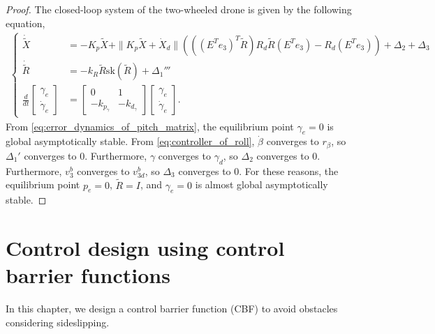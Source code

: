 \begin{proof}
    The closed-loop system of the two-wheeled drone is given by the following equation,
    \begin{align}
        \label{eq:stability_proof_of_cascade_1}
        \begin{cases}
            \dot{\tilde{X}} &= - K_p \tilde{X} + \| K_p \tilde{X} + \dot{X}_d \| \left ( \left ( \left (E^Te_3 \right )^T \tilde{R} \right ) R_d \tilde{R} (E^T e_3) - R_d (E^T e_3) \right ) + \Delta_2 + \Delta_3 \\
            \dot{\tilde{R}} &= - k_R \tilde{R} \mathrm{sk} (\tilde{R}) + \Delta_1''' \\
            \frac{d}{dt}
            \begin{bmatrix}
                \gamma_e \\
                \dot{\gamma}_e
            \end{bmatrix}
            &=
            \begin{bmatrix}
                0 & 1 \\
                - k_{p_{\gamma}} & -k_{d_{\gamma}}
            \end{bmatrix}
            \begin{bmatrix}
                \gamma_e \\
                \dot{\gamma}_e
            \end{bmatrix}.
        \end{cases}
    \end{align}
    From \eqref{eq:error_dynamics_of_pitch_matrix}, the equilibrium point $ \gamma_e = 0 $ is global asymptotically stable.
    From \eqref{eq:controller_of_roll}, $ \dot{\beta} $ converges to $ r_{\beta} $, so $ \Delta_1' $ converges to $ 0 $.
    Furthermore, $ \gamma $ converges to $ \gamma_d $, so $ \Delta_2 $ converges to $ 0 $.
    Furthermore, $ v_3^b $ converges to $ v_{3d}^b $, so $ \Delta_3 $ converges to $ 0 $.
    For these reasons, the equilibrium point $ p_e = 0 $, $ \tilde{R} = I $, and $ \gamma_e = 0 $ is almost global asymptotically stable. 
\end{proof}

\section{Control design using control barrier functions}
\label{sec:control_design_using_CBF}
In this chapter, we design a control barrier function (CBF) to avoid obstacles considering sideslipping.

